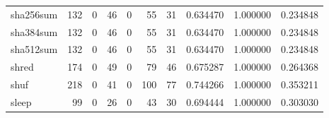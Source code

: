 \begin{tabular}{lrrrrrrrrr}
sha256sum &                                                132 &                                                  0 &                                                 46 &                                                  0 &                                                 55 &                                                 31 &                                           0.634470 &                               1.000000 &                             0.234848 \\
sha384sum &                                                132 &                                                  0 &                                                 46 &                                                  0 &                                                 55 &                                                 31 &                                           0.634470 &                               1.000000 &                             0.234848 \\
sha512sum &                                                132 &                                                  0 &                                                 46 &                                                  0 &                                                 55 &                                                 31 &                                           0.634470 &                               1.000000 &                             0.234848 \\
shred     &                                                174 &                                                  0 &                                                 49 &                                                  0 &                                                 79 &                                                 46 &                                           0.675287 &                               1.000000 &                             0.264368 \\
shuf      &                                                218 &                                                  0 &                                                 41 &                                                  0 &                                                100 &                                                 77 &                                           0.744266 &                               1.000000 &                             0.353211 \\
sleep     &                                                 99 &                                                  0 &                                                 26 &                                                  0 &                                                 43 &                                                 30 &                                           0.694444 &                               1.000000 &                             0.303030 \\

\end{tabular}

